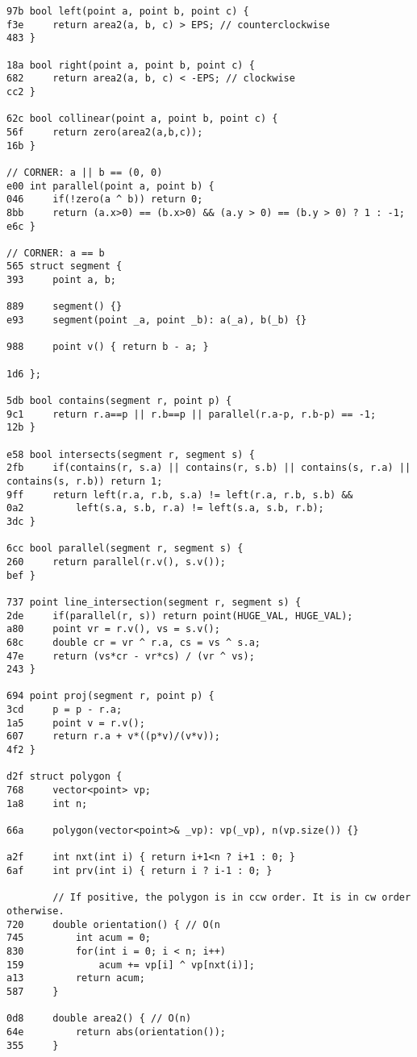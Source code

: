 \documentclass[11pt, a4paper, twoside]{article}
\begin{document}
\begin{lstlisting}
97b bool left(point a, point b, point c) {
f3e 	return area2(a, b, c) > EPS; // counterclockwise
483 }

18a bool right(point a, point b, point c) {
682 	return area2(a, b, c) < -EPS; // clockwise
cc2 }

62c bool collinear(point a, point b, point c) {
56f 	return zero(area2(a,b,c));
16b }

// CORNER: a || b == (0, 0)
e00 int parallel(point a, point b) {
046 	if(!zero(a ^ b)) return 0;
8bb 	return (a.x>0) == (b.x>0) && (a.y > 0) == (b.y > 0) ? 1 : -1;
e6c }

// CORNER: a == b
565 struct segment {
393 	point a, b;
    
889 	segment() {}
e93 	segment(point _a, point _b): a(_a), b(_b) {}
    
988 	point v() { return b - a; }
    
1d6 };

5db bool contains(segment r, point p) {
9c1 	return r.a==p || r.b==p || parallel(r.a-p, r.b-p) == -1;
12b }

e58 bool intersects(segment r, segment s) {
2fb 	if(contains(r, s.a) || contains(r, s.b) || contains(s, r.a) || contains(s, r.b)) return 1;
9ff 	return left(r.a, r.b, s.a) != left(r.a, r.b, s.b) && 
0a2 		left(s.a, s.b, r.a) != left(s.a, s.b, r.b);
3dc }

6cc bool parallel(segment r, segment s) {
260 	return parallel(r.v(), s.v());
bef }

737 point line_intersection(segment r, segment s) {
2de 	if(parallel(r, s)) return point(HUGE_VAL, HUGE_VAL);
a80 	point vr = r.v(), vs = s.v();
68c 	double cr = vr ^ r.a, cs = vs ^ s.a;
47e 	return (vs*cr - vr*cs) / (vr ^ vs);
243 }

694 point proj(segment r, point p) {
3cd 	p = p - r.a;
1a5 	point v = r.v();
607 	return r.a + v*((p*v)/(v*v));
4f2 }

d2f struct polygon {
768 	vector<point> vp;
1a8 	int n;
    
66a 	polygon(vector<point>& _vp): vp(_vp), n(vp.size()) {}
    
a2f 	int nxt(int i) { return i+1<n ? i+1 : 0; }
6af 	int prv(int i) { return i ? i-1 : 0; }
    
    	// If positive, the polygon is in ccw order. It is in cw order otherwise.
720 	double orientation() { // O(n
745 		int acum = 0;
830 		for(int i = 0; i < n; i++)
159 			acum += vp[i] ^ vp[nxt(i)];
a13 		return acum;
587 	}
    
0d8 	double area2() { // O(n)
64e 		return abs(orientation());
355 	}
    

\end{lstlisting}
\end{document}

